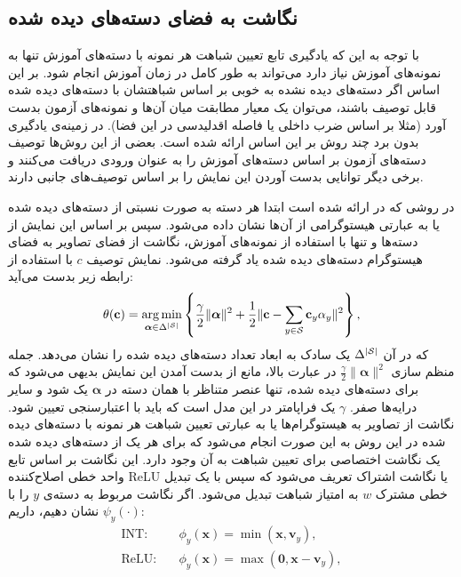 \subsection{نگاشت به فضای دسته‌های دیده شده}
با توجه به این که یادگیری تابع تعیین شباهت هر نمونه با دسته‌های آموزش تنها به نمونه‌های آموزش نیاز دارد می‌تواند به طور کامل در زمان آموزش انجام شود. بر این اساس اگر دسته‌های دیده نشده به خوبی بر اساس شباهتشان با دسته‌های دیده شده قابل توصیف باشند، می‌توان یک معیار مطابقت میان آن‌ها و نمونه‌های آزمون بدست آورد (مثلا بر اساس ضرب داخلی یا فاصله اقدلیدسی در این فضا). در زمینه‌ی یادگیری بدون برد چند روش بر این اساس ارائه شده است. بعضی از این روش‌ها توصیف دسته‌های آزمون بر اساس دسته‌های آموزش را به عنوان ورودی دریافت می‌کنند و برخی دیگر توانایی بدست آوردن این نمایش را بر اساس توصیف‌های جانبی دارند. 

در روشی که در 
\cite{sse}
ارائه شده است ابتدا هر دسته به صورت نسبتی از دسته‌های دیده شده یا به عبارتی هیستوگرامی از آن‌ها نشان داده می‌شود. سپس بر اساس این نمایش از دسته‌ها و تنها با استفاده از نمونه‌های آموزش، نگاشت از فضای تصاویر به فضای هیستوگرام دسته‌های دیده شده یاد گرفته می‌شود. نمایش توصیف $c$ با استفاده از رابطه زیر بدست می‌آید:
\begin{equation}\label{eqn:sse_source}
\theta(\mathbf{c})=
\operatorname*{arg\,min}_{\boldsymbol{\alpha}\in \Delta^{|{\cal S}|}} \left\{\frac{\gamma}{2}\|\boldsymbol{\alpha}\|^2+\frac{1}{2}\|\mathbf{c}-\sum_{y\in\mathcal{S}}\mathbf{c}_y \alpha_y\|^2\right\},
\end{equation}
که در آن 
$\Delta^{|{\cal S}|} $
یک سادک  به ابعاد تعداد دسته‌های دیده شده را نشان می‌دهد. جمله منظم سازی $\frac{\gamma}{2}\|\boldsymbol{\alpha}\|^2$ در عبارت بالا، مانع از بدست آمدن این نمایش بدیهی می‌شود که برای دسته‌های دیده شده، تنها عنصر متناظر با همان دسته در $\boldsymbol{\alpha}$ یک شود و سایر درایه‌ها صفر. $\gamma$ یک فراپامتر در این مدل است که باید با اعتبارسنجی تعیین شود. 
نگاشت از تصاویر به هیستوگرام‌ها یا به عبارتی تعیین شباهت هر نمونه با دسته‌های دیده شده در این روش به این صورت انجام می‌شود که برای هر یک از دسته‌های دیده شده یک نگاشت اختصاصی برای تعیین شباهت به آن وجود دارد. 
این نگاشت بر اساس تابع واحد خطی اصلاح‌کننده ReLU یا نگاشت اشتراک 
 تعریف می‌شود که سپس با یک تبدیل خطی مشترک $w$ به امتیاز شباهت تبدیل می‌شود. اگر نگاشت مربوط به دسته‌ی $y$ را با $\psi_y(\cdot)$ نشان دهیم، داریم:
\begin{align}
\mbox{INT:} & \quad \phi_y(\mathbf{x})=\min(\mathbf{x}, \mathbf{v}_y), \label{eqn:int}\\
\mbox{ReLU:} & \quad \phi_y(\mathbf{x})=\max(\mathbf{0}, \mathbf{x}-\mathbf{v}_y), \label{eqn:relu}
\end{align}

